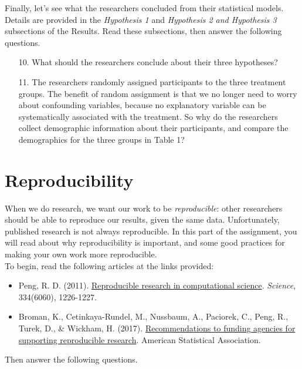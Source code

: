 \documentclass[12pt]{article}
\begin{document}
Finally, let's see what the researchers concluded from their statistical models. Details are provided in the \textit{Hypothesis 1} and \textit{Hypothesis 2 and Hypothesis 3} subsections of the Results. Read these subsections, then answer the following questions.

\begin{enumerate}
    \item[10.] What should the researchers conclude about their three hypotheses?
    
    \item[11.] The researchers randomly assigned participants to the three treatment groups. The benefit of random assignment is that we no longer need to worry about confounding variables, because no explanatory variable can be systematically associated with the treatment. So why do the researchers collect demographic information about their participants, and compare the demographics for the three groups in Table 1?
\end{enumerate}

\section{Reproducibility}

When we do research, we want our work to be \textit{reproducible}: other researchers should be able to reproduce our results, given the same data. Unfortunately, published research is not always reproducible. In this part of the assignment, you will read about why reproducibility is important, and some good practices for making your own work more reproducible.\\

\noindent To begin, read the following articles at the links provided:
\begin{itemize}
\item Peng, R. D. (2011). \href{https://www.ncbi.nlm.nih.gov/pmc/articles/PMC3383002/}{Reproducible research in computational science}. \textit{Science}, 334(6060), 1226-1227.

\item Broman, K., Cetinkaya-Rundel, M., Nussbaum, A., Paciorek, C., Peng, R., Turek, D., \& Wickham, H. (2017). \href{https://www.amstat.org/docs/default-source/amstat-documents/pol-reproducibleresearchrecommendations.pdf}{Recommendations to funding agencies for supporting reproducible research}. American Statistical Association.
\end{itemize}
Then answer the following questions.
\end{document}
